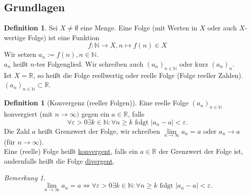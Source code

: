 \documentclass[12pt,a4paper,titlepage]{article} %
\theoremstyle{definition}
\newtheorem{defi}[satz]{Definition}
\theoremstyle{remark}
\newtheorem*{bem}{Bemerkung}
\newcommand{\N}{\mathbb{N}}
\newcommand{\R}{\mathbb{R}}
\begin{document}
\subsection{Grundlagen}
\begin{defi}
	Sei $X\neq\emptyset$ eine Menge. Eine Folge (mit Werten in $X$ oder auch $X$-wertige Folge) ist eine Funktion 
	$$f: \N \rightarrow X, n \mapsto f(n)\in X$$
	Wir setzen $a_n := f(n), n\in\N$.\\
	$a_n$ heißt $n$-tes Folgenglied. Wir schreiben auch $(a_n)_{n\in\N}$ oder kurz $(a_n)_n$.\\
	Ist $X = \R$, so heißt die Folge reellwertig oder reelle Folge (Folge reeller Zahlen). $(a_n)_{n\in\N} \subset \R$.
\end{defi}
\begin{defi}[Konvergenz (reeller Folgen)]
	Eine reelle Folge $(a_n)_{n\in\N}$ konvergiert (mit $n\rightarrow\infty)$ gegen ein $a\in\R$, falls 
	$$\forall \varepsilon > 0 \exists k \in \N: \forall n\geq k \text{ folgt } |a_n - a| < \varepsilon.$$
	Die Zahl $a$ heißt Grenzwert der Folge, wir schreiben $\lim\limits_{n\rightarrow\infty}a_n = a$ oder $a_n\rightarrow a$ (für $n\rightarrow\infty$).\\
	Eine (reelle) Folge heißt \underline{konvergent}, falls ein $a\in\R$ der Grenzwert der Folge ist, andernfalls heißt die Folge \underline{divergent}.
\end{defi}
\begin{bem}
	$$\lim\limits_{n\rightarrow\infty}a_n = a \Leftrightarrow \forall \varepsilon > 0 \exists k\in\N: \forall n\geq k \text{ folgt } |a_n -a|< \varepsilon.$$
\end{bem}
\end{document}
